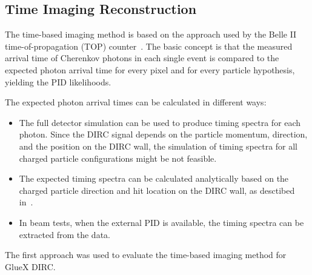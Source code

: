 \subsection{Time Imaging Reconstruction}
\label{sec:ti}

The time-based imaging method is based on the approach used by the Belle II time-of-propagation (TOP) counter~\cite{staric2}. The basic concept is that the measured arrival time of Cherenkov photons in each single event is compared to the expected photon arrival time for every pixel and for every particle hypothesis, yielding the PID likelihoods.

The expected photon arrival times can be calculated in different ways:
\begin{itemize}
\item The full detector simulation can be used to produce timing spectra for each photon. Since the DIRC signal depends on the particle momentum, direction, and the position on the DIRC wall, the simulation of timing spectra for all charged particle configurations might be not feasible.
\item The expected timing spectra can be calculated analytically based on the charged particle direction and hit location on the DIRC wall, as desctibed in~\cite{staric2, staric3}.
\item In beam tests, when the external PID is available, the timing spectra can be extracted from the data.
\end{itemize}

The first approach was used to evaluate the time-based imaging method for GlueX DIRC.

